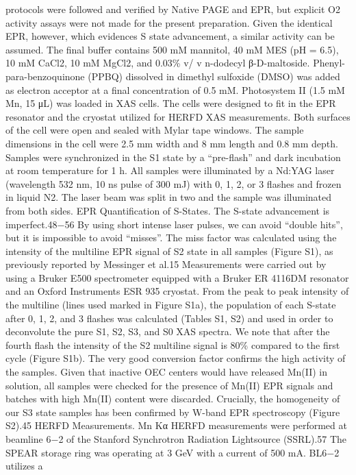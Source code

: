 \documentclass{article}
\begin{document}
protocols were followed and verified by Native PAGE and
EPR, but explicit O2 activity assays were not made for the
present preparation. Given the identical EPR, however, which
evidences S state advancement, a similar activity can be
assumed. The final buffer contains 500 mM mannitol, 40 mM
MES (pH = 6.5), 10 mM CaCl2, 10 mM MgCl2, and 0.03\% v/
v n-dodecyl β-D-maltoside. Phenyl-para-benzoquinone
(PPBQ) dissolved in dimethyl sulfoxide (DMSO) was added
as electron acceptor at a final concentration of 0.5 mM.
Photosystem II (1.5 mM Mn, 15 μL) was loaded in XAS cells.
The cells were designed to fit in the EPR resonator and the
cryostat utilized for HERFD XAS measurements. Both surfaces
of the cell were open and sealed with Mylar tape windows. The
sample dimensions in the cell were 2.5 mm width and 8 mm
length and 0.8 mm depth. Samples were synchronized in the S1
state by a “pre-flash” and dark incubation at room temperature
for 1 h. All samples were illuminated by a Nd:YAG laser
(wavelength 532 nm, 10 ns pulse of 300 mJ) with 0, 1, 2, or 3
flashes and frozen in liquid N2. The laser beam was split in two
and the sample was illuminated from both sides.
EPR Quantification of S-States. The S-state advancement
is imperfect.48−56 By using short intense laser pulses, we can
avoid “double hits”, but it is impossible to avoid “misses”. The
miss factor was calculated using the intensity of the multiline
EPR signal of S2 state in all samples (Figure S1), as previously
reported by Messinger et al.15 Measurements were carried out
by using a Bruker E500 spectrometer equipped with a Bruker
ER 4116DM resonator and an Oxford Instruments ESR 935
cryostat. From the peak to peak intensity of the multiline (lines
used marked in Figure S1a), the population of each S-state
after 0, 1, 2, and 3 flashes was calculated (Tables S1, S2) and
used in order to deconvolute the pure S1, S2, S3, and S0 XAS
spectra. We note that after the fourth flash the intensity of the
S2 multiline signal is 80\% compared to the first cycle (Figure
S1b). The very good conversion factor confirms the high
activity of the samples. Given that inactive OEC centers would
have released Mn(II) in solution, all samples were checked for
the presence of Mn(II) EPR signals and batches with high
Mn(II) content were discarded. Crucially, the homogeneity of
our S3 state samples has been confirmed by W-band EPR
spectroscopy (Figure S2).45
HERFD Measurements. Mn Kα HERFD measurements
were performed at beamline 6−2 of the Stanford Synchrotron
Radiation Lightsource (SSRL).57 The SPEAR storage ring was
operating at 3 GeV with a current of 500 mA. BL6−2 utilizes a
\end{document}
